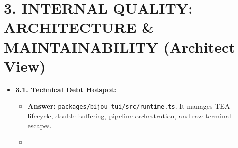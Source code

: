 \section{3. INTERNAL QUALITY: ARCHITECTURE \& MAINTAINABILITY (Architect View)}\label{record-413-internal-quality-architecture-maintainability-architect-view}

\begin{itemize}
\tightlist
\item
  \textbf{3.1. Technical Debt Hotspot:}

  \begin{itemize}
  \tightlist
  \item
    \textbf{Answer:} \texttt{p\allowbreak{}a\allowbreak{}c\allowbreak{}k\allowbreak{}a\allowbreak{}g\allowbreak{}e\allowbreak{}s\allowbreak{}/\allowbreak{}b\allowbreak{}i\allowbreak{}j\allowbreak{}o\allowbreak{}u\allowbreak{}-\allowbreak{}t\allowbreak{}u\allowbreak{}i\allowbreak{}/\allowbreak{}s\allowbreak{}r\allowbreak{}c\allowbreak{}/\allowbreak{}r\allowbreak{}u\allowbreak{}n\allowbreak{}t\allowbreak{}i\allowbreak{}m\allowbreak{}e\allowbreak{}.\allowbreak{}t\allowbreak{}s}. It manages TEA lifecycle, double-buffering, pipeline orchestration, and raw terminal escapes.
  \item

\end{itemize}
\end{itemize}
